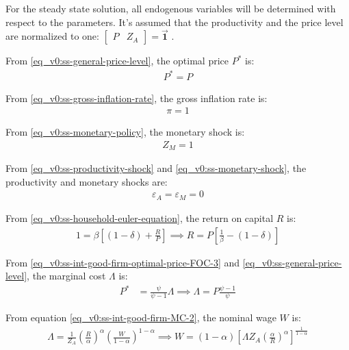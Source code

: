 \documentclass[
thesis.tex
]{subfiles}
\begin{document}
	
	For the steady state solution, all endogenous variables will be determined with respect to the parameters. It's assumed that the productivity and the price level are normalized to one: $\left[ \begin{smallmatrix} P & Z_A \end{smallmatrix} \right] = \vec{\bm{1}}$ \footnotemark{}. 
	
	From \ref{eq_v0:ss-general-price-level}, the optimal price $P^\ast$ is:
	\begin{align}
		P^\ast = P
	\end{align}
	
	From \ref{eq_v0:ss-gross-inflation-rate}, the gross inflation rate is:
	\begin{align}
		\pi = 1
	\end{align}
	
	From \ref{eq_v0:ss-monetary-policy}, the monetary shock is:
	\begin{align}
		Z_{M} = 1
	\end{align}
	
	From \ref{eq_v0:ss-productivity-shock} and \ref{eq_v0:ss-monetary-shock}, the productivity and monetary shocks are:
	\begin{align}
		\varepsilon_{A} = \varepsilon_{M} = 0
	\end{align}
	
	From \ref{eq_v0:ss-household-euler-equation}, the return on capital $R$ is:
	\begin{align}
		\label{eq_v0:ss-return-on-capital}
		1 = \beta \left[ (1-\delta) + \frac{R}{P} \right] \implies 
		R = P\left[ \frac{1}{\beta} - (1-\delta) \right]
	\end{align}
	
	From \ref{eq_v0:ss-int-good-firm-optimal-price-FOC-3} and \ref{eq_v0:ss-general-price-level}, the marginal cost $\Lambda$ is:
	\begin{align}
		\label{eq_v0:ss-marginal-cost}
		P^\ast &= \frac{\psi}{\psi-1} \Lambda \implies 
		\Lambda = P \frac{\psi-1}{\psi}
	\end{align}
	
	From equation \ref{eq_v0:ss-int-good-firm-MC-2}, the nominal wage $W$ is:
	\begin{align}
		\Lambda = \frac{1}{Z_{A}} \left( \frac{R}{\alpha} \right)^{\alpha} \left( \frac{W}{1-\alpha} \right)^{1-\alpha} \implies 
		W = (1-\alpha) \left[ \Lambda Z_{A} \left( \frac{\alpha}{R} \right)^{\alpha} \right]^\frac{1}{1-\alpha} 
		\label{eq_v0:ss-nominal-wage}
	\end{align}
	
\end{document}
